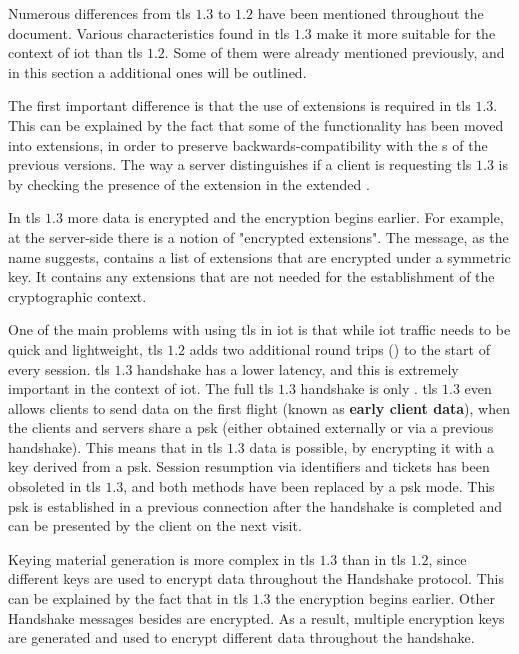 \documentclass{llncs}
\begin{document}
Numerous differences from \gls{tls} $1.3$ to $1.2$ have been mentioned throughout the document.
Various characteristics found in \gls{tls} $1.3$ make it more suitable for the context
of \gls{iot} than \gls{tls} $1.2$. Some of them were already mentioned previously, and in this section a additional ones will be outlined.

The first important difference is that the use of extensions is required in \gls{tls} $1.3$.
This can be explained by the fact that some of the functionality has been moved into extensions, in order to preserve
backwards-compatibility with the s of the previous versions.
The way a server distinguishes if a client is requesting \gls{tls} $1.3$
is by checking the presence of the  extension in the
extended .

In \gls{tls} $1.3$ more data is encrypted and the encryption begins earlier. For example,
at the server-side there is a notion of "encrypted extensions". The 
message, as the name suggests, contains a list of extensions that are encrypted
under a symmetric key. It contains any extensions that are not needed
for the establishment of the cryptographic context.

One of the main problems with using \gls{tls} in \gls{iot} is that while \gls{iot}
traffic needs to be quick and lightweight, \gls{tls} $1.2$ adds two additional
round trips () to the start of every session. \gls{tls} $1.3$ handshake has a lower latency,
and this is extremely important in the context of \gls{iot}.
The full \gls{tls} $1.3$ handshake is only . \gls{tls} $1.3$ even allows
clients to send data on the first flight (known as \textbf{early client data}), when the clients
and servers share a \gls{psk} (either obtained externally or via a previous handshake).
This means that in \gls{tls} $1.3$  data is possible, by
encrypting it with a key derived from a \gls{psk}. Session resumption
via identifiers and tickets has been obsoleted in \gls{tls} $1.3$, and both methods
have been replaced by a \gls{psk} mode. This \gls{psk} is established in a previous
connection after the handshake is completed and can be presented by the client
on the next visit.

Keying material generation is more complex in \gls{tls} $1.3$ than in
\gls{tls} $1.2$, since different
keys are used to encrypt data throughout the Handshake protocol. This can be
explained by the fact that in \gls{tls} $1.3$ the encryption begins earlier.
Other Handshake messages besides  are encrypted. As a result,
multiple encryption keys are generated and used to encrypt different data
throughout the handshake.
\end{document}
